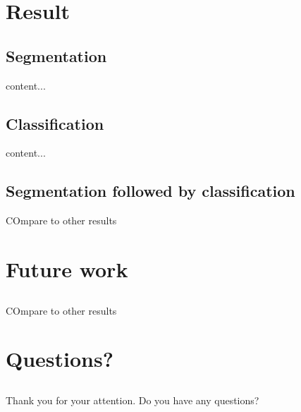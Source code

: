 \documentclass[aspectratio=169]{beamer}
\let\oldsection\section
\renewcommand{\section}[1]{
    \oldsection{#1}	
    \subsection{}
}
\newenvironment{myframe}[1][t]{\begin{frame}[#1]{\secname}{\subsecname}}{\end{frame}}
\begin{document}
    \section{Result}
    
    \subsection{Segmentation}
    
    \begin{myframe}
        content...
    \end{myframe}
    
    \subsection{Classification}
    
    \begin{myframe}
        content...
    \end{myframe}
    
    \subsection{Segmentation followed by classification}
    
    \begin{myframe}
        COmpare to other results
    \end{myframe}
    
    \section{Future work}
    
    \begin{myframe}
        COmpare to other results
    \end{myframe}
    
    \section{Questions?}
    
    \begin{myframe}
        Thank you for your attention.
        Do you have any questions?
    \end{myframe}


%        
%
%             
%                
   
\end{document}
